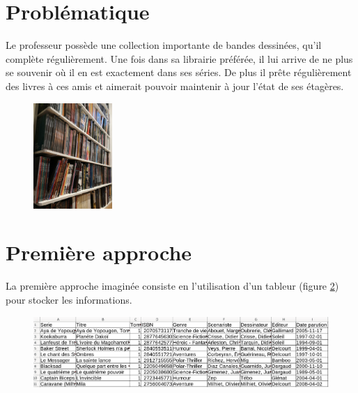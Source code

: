 \documentclass[a4paper,11pt]{article}
\begin{document}
\begin{Form}

\section{Problématique}
Le professeur possède une collection importante de bandes dessinées, qu'il complète régulièrement. Une fois dans sa librairie préférée, il lui arrive de ne plus se souvenir où il en est exactement dans ses séries. De plus il prête régulièrement des livres à ces amis et aimerait pouvoir maintenir à jour l'état de ses étagères.
\begin{figure}[!h]
\centering
\includegraphics[width=3cm]{ressources/biblio.jpg}
\label{biblio}
\end{figure}

\begin{center}
\end{center}
\section{Première approche}
La première approche imaginée consiste en l'utilisation d'un tableur (figure \ref{tableur}) pour stocker les informations.
\begin{figure}[!h]
\centering
\includegraphics[width=15cm]{ressources/approche-1.png}
\label{tableur}
\end{figure}


\end{Form}
\end{document}
